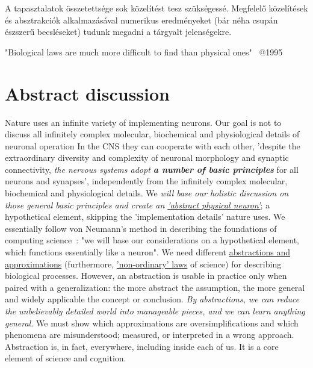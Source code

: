 {
A tapasztalatok összetettsége sok  közelítést tesz szükségessé.
Megfelelő közelítések és absztrakciók alkalmazásával
numerikus eredményeket (bár néha csupán észszerű becsléseket)
tudunk megadni a tárgyalt jelenségekre.
}

\fi


\quotationbox
{
"Biological laws are much more difficult to find than physical ones"~\cite{VollmerLimitsOfBiology:1995} @1995
}




\section[Abstract discussion]{Abstract discussion\label{sec:Intro-Abstract}}

Nature uses an infinite variety of implementing neurons. 
Our goal is not to discuss all
infinitely complex molecular, biochemical and physiological details
of neuronal operation
In the \gls{CNS} 
they can cooperate
with each other, 'despite the extraordinary diversity and complexity of neuronal morphology and synaptic connectivity,
\textit{the nervous systems adopt \textbf{a number of
 basic principles}}
for all neurons and synapses',
\cite{JohnstonWuNeurophysiology:1995}
independently from the infinitely complex molecular, biochemical and physiological details.
We \textit{will base our holistic discussion on those general basic principles 
and create an 
\hyperlink{NeuronPhysical}
{'abstract physical neuron'}}; a hypothetical element,
skipping the 'implementation details' nature uses.
We essentially follow von Neumann's method in describing the foundations of
computing science~\cite{EDVACreport1945}: "we will base our considerations on a hypothetical element, which functions essentially like a neuron".
We need different \hyperlink{Abstractions}
{abstractions and approximations} 
(furthermore, \hyperlink{NonOrdinaryLaws}{'non-ordinary' laws} of science) for describing biological processes.
However, an abstraction is usable
in practice only when paired with a generalization: the more abstract the assumption, the more general and widely applicable the concept or conclusion.
\textit{By abstractions, we can reduce the unbelievably detailed world into manageable pieces, and we can learn anything general.}
We must show which approximations are oversimplifications and which phenomena are misunderstood; measured, or interpreted in a wrong approach.
Abstraction is, in fact, everywhere, including inside each of us. It is a core element of science and cognition. 

